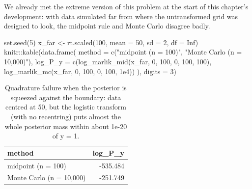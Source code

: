 \documentclass[
  letterpaper,
  DIV=11,
  numbers=noendperiod]{scrreprt}
\newenvironment{Shaded}{\begin{snugshade}}{\end{snugshade}}
\newcommand{\AttributeTok}[1]{\textcolor[rgb]{0.40,0.45,0.13}{#1}}
\newcommand{\ConstantTok}[1]{\textcolor[rgb]{0.56,0.35,0.01}{#1}}
\newcommand{\DecValTok}[1]{\textcolor[rgb]{0.68,0.00,0.00}{#1}}
\newcommand{\FloatTok}[1]{\textcolor[rgb]{0.68,0.00,0.00}{#1}}
\newcommand{\FunctionTok}[1]{\textcolor[rgb]{0.28,0.35,0.67}{#1}}
\newcommand{\NormalTok}[1]{\textcolor[rgb]{0.00,0.23,0.31}{#1}}
\newcommand{\OtherTok}[1]{\textcolor[rgb]{0.00,0.23,0.31}{#1}}
\newcommand{\SpecialCharTok}[1]{\textcolor[rgb]{0.37,0.37,0.37}{#1}}
\newcommand{\StringTok}[1]{\textcolor[rgb]{0.13,0.47,0.30}{#1}}
\begin{document}
We already met the extreme version of this problem at the start of this
chapter's development: with data simulated far from where the
untransformed grid was designed to look, the midpoint rule and Monte
Carlo disagree badly.

\begin{Shaded}
\begin{Highlighting}[]
\FunctionTok{set.seed}\NormalTok{(}\DecValTok{5}\NormalTok{)}
\NormalTok{x\_far }\OtherTok{\textless{}{-}} \FunctionTok{rt.scaled}\NormalTok{(}\DecValTok{100}\NormalTok{, }\AttributeTok{mean =} \DecValTok{50}\NormalTok{, }\AttributeTok{sd =} \DecValTok{2}\NormalTok{, }\AttributeTok{df =} \ConstantTok{Inf}\NormalTok{)}
\NormalTok{knitr}\SpecialCharTok{::}\FunctionTok{kable}\NormalTok{(}\FunctionTok{data.frame}\NormalTok{(}
    \AttributeTok{method =} \FunctionTok{c}\NormalTok{(}\StringTok{"midpoint (n = 100)"}\NormalTok{, }\StringTok{"Monte Carlo (n = 10,000)"}\NormalTok{),}
    \AttributeTok{log\_P\_y =} \FunctionTok{c}\NormalTok{(}\FunctionTok{log\_marlik\_mid}\NormalTok{(x\_far, }\DecValTok{0}\NormalTok{, }\DecValTok{100}\NormalTok{, }\DecValTok{0}\NormalTok{, }\DecValTok{100}\NormalTok{, }\DecValTok{100}\NormalTok{),}
                \FunctionTok{log\_marlik\_mc}\NormalTok{(x\_far, }\DecValTok{0}\NormalTok{, }\DecValTok{100}\NormalTok{, }\DecValTok{0}\NormalTok{, }\DecValTok{100}\NormalTok{, }\FloatTok{1e4}\NormalTok{))}
\NormalTok{), }\AttributeTok{digits =} \DecValTok{3}\NormalTok{)}
\end{Highlighting}
\end{Shaded}

{

\begin{longtable}[]{@{}lr@{}}

\caption{\label{tbl-quad-failure}Quadrature failure when the posterior
is squeezed against the boundary: data centred at 50, but the logistic
transform (with no recentring) puts almost the whole posterior mass
within about 1e-20 of y = 1.}

\tabularnewline

\toprule\noalign{}
method & log\_P\_y \\
\midrule\noalign{}
\endhead
\bottomrule\noalign{}
\endlastfoot
midpoint (n = 100) & -535.484 \\
Monte Carlo (n = 10,000) & -251.749 \\

\end{longtable}

}
\end{document}
